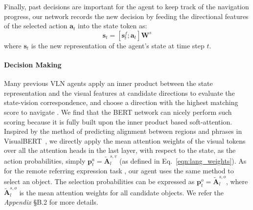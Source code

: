 \documentclass[final]{cvpr}
\begin{document}
Finally, past decisions are important for the agent to keep track of the navigation progress, our network records the new decision by feeding the directional features of the selected action $\boldsymbol{a}_{t}$ into the state token as:
\begin{equation}
\boldsymbol{s}_{t}=\left[\boldsymbol{s}^{f}_{t};\boldsymbol{a}_{t}\right]\boldsymbol{W}^{s}
\label{eqn:stateaction}
\end{equation}
where $\boldsymbol{s}_{t}$ is the new representation of the agent's state at time step $t$.



\paragraph{Decision Making \label{decision}}
Many previous VLN agents apply an inner product between the state representation and the visual features at candidate directions to evaluate the state-vision correspondence, and choose a direction with the highest matching score to navigate \cite{ma2019self, tan2019learning}. We find that the BERT network can nicely perform such scoring because it is fully built upon the inner product based soft-attention. Inspired by the method of predicting alignment between regions and phrases in VisualBERT~\cite{li2019visualbert}, we directly apply the mean attention weights of the visual tokens over all the attention heads in the last layer, with respect to the state, as the action probabilities, simply $\boldsymbol{p}^{a}_{t}=\widetilde{\boldsymbol{A}}^{s,v}_{l}$ (as defined in Eq.~\ref{eqn:lang_weights}).
As for the remote referring expression task \cite{qi2020reverie}, our agent uses the same method to select an object. The selection probabilities can be expressed as $\boldsymbol{p}^{o}_{t}=\widetilde{\boldsymbol{A}}^{s,o}_{l}$, where $\widetilde{\boldsymbol{A}}^{s,o}_{l}$ is the mean attention weights for all candidate objects. We refer the \textit{Appendix} \S B.2 for more details.
\end{document}
